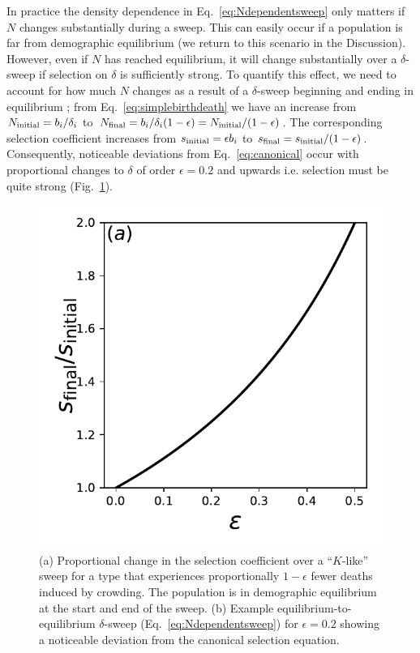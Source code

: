 \documentclass[12pt]{article}
\begin{document}
In practice the density dependence in Eq.~\eqref{eq:Ndependentsweep} only matters if $N$ changes substantially during a sweep. This can easily occur if a population is far from demographic equilibrium (we return to this scenario in the Discussion). However, even if $N$ has reached equilibrium, it will change substantially over a $\delta$-sweep if selection on $\delta$ is sufficiently strong. To quantify this effect, we need to account for how much $N$ changes as a result of a $\delta$-sweep beginning and ending in equilibrium \citep{kimura1969natural}; from Eq.~\eqref{eq:simplebirthdeath} we have an increase from $N_{\rm initial}=b_i/\delta_i$ to $N_{\rm final}=b_i/\delta_i(1-\epsilon)=N_{\rm initial}/(1-\epsilon)$. The corresponding selection coefficient increases from $s_{\rm initial}= \epsilon b_i$ to $s_{\rm final}=s_{\rm initial}/(1-\epsilon)$. Consequently, noticeable deviations from Eq.~\eqref{eq:canonical} occur with proportional changes to $\delta$ of order $\epsilon=0.2$ and upwards i.e. selection must be quite strong (Fig.~\ref{fig:strengthofselection}). 

\begin{figure}
\centering
\includegraphics[scale=0.8]{strengthofselection.pdf}
\caption{\label{fig:strengthofselection} (a) Proportional change in the selection coefficient over a ``$K$-like'' sweep for a type that experiences proportionally $1-\epsilon$ fewer deaths induced by crowding. The population is in demographic equilibrium at the start and end of the sweep. (b) Example equilibrium-to-equilibrium $\delta$-sweep (Eq.~\ref{eq:Ndependentsweep}) for $\epsilon=0.2$ showing a noticeable deviation from the canonical selection equation.}
\end{figure}
\end{document}
